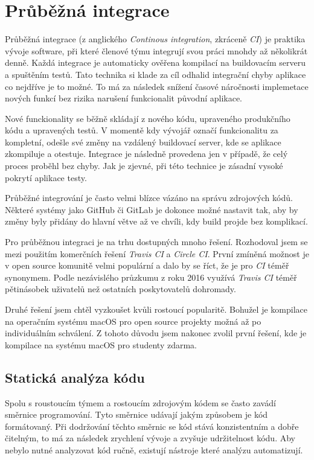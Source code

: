 \section{Průběžná integrace}

Průběžná integrace (z anglického \textit{Continous integration}, zkráceně \textit{CI}) je praktika vývoje software, při které členové týmu integrují svou práci mnohdy až několikrát denně.
Každá integrace je automaticky ověřena kompilací na buildovacím serveru a spuštěním testů.
Tato technika si klade za cíl odhalid integrační chyby aplikace co nejdříve je to možné.
To má za následek snížení časové náročnosti implemetace nových funkcí bez rizika narušení funkcionalit původní aplikace.

Nové funckionality se běžně skládají z nového kódu, upraveného produkčního kódu a upravených testů.
V momentě kdy vývojář označí funkcionalitu za kompletní, odešle své změny na vzdálený buildovací server, kde se aplikace zkompiluje a otestuje.
Integrace je následně provedena jen v případě, že celý proces proběhl bez chyby.
Jak je zjevné, při této technice je zásadní vysoké pokrytí aplikace testy.

Průběžné integrování je často velmi blízce vázáno na správu zdrojových kódů.
Některé systémy jako GitHub či GitLab je dokonce možné nastavit tak, aby by změny byly přidány do hlavní větve až ve chvíli, kdy build projde bez komplikací. \cite{travis-ci-building-pr}

Pro průběžnou integraci je na trhu dostupných mnoho řešení.
Rozhodoval jsem se mezi použitím komerčních řešení \textit{Travis CI} a \textit{Circle CI}.
První zmíněná možnost je v open source komunitě velmi populární a dalo by se říct, že je pro \textit{CI} téměř synonymem.
Podle nezávislého průzkumu z roku 2016 využívá \textit{Travis CI} téměř pětinásobek uživatelů než ostatních poskytovatelů dohromady. \cite{oregonstate-ci-survey}

Druhé řešení jsem chtěl vyzkoušet kvůli rostoucí popularitě. \cite{circleci-popularity}
Bohužel je kompilace na operačním systému macOS pro open source projekty možná až po individuálním schválení. \cite{circleci-pricing}
Z tohoto důvodu jsem nakonec zvolil první řešení, kde je kompilace na systému macOS pro studenty zdarma.

\subsection{Statická analýza kódu}

Spolu s roustoucím týmem a rostoucím zdrojovým kódem se často zavádí směrnice programování.
Tyto směrnice udávají jakým způsobem je kód formátovaný.
Při dodržování těchto směrnic se kód stává konzistentním a dobře čitelným, to má za následek zrychlení vývoje a zvyšuje udržitelnost kódu.
Aby nebylo nutné analyzovat kód ručně, existují nástroje které analýzu automatizují.

